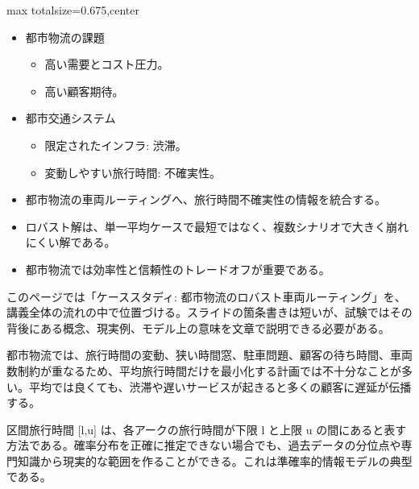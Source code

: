 \clearpage
{}
\begin{adjustbox}{max totalsize={\textwidth}{0.675\textheight},center}
\begin{minipage}{\textwidth}\scriptsize
\begin{minipage}[t]{0.485\textwidth}
\begin{itemize}
\item 都市物流の課題
\begin{itemize}
\item 高い需要とコスト圧力。
\item 高い顧客期待。
\end{itemize}
\item 都市交通システム
\begin{itemize}
\item 限定されたインフラ: 渋滞。
\item 変動しやすい旅行時間: 不確実性。
\end{itemize}
\item 都市物流の車両ルーティングへ、旅行時間不確実性の情報を統合する。
\end{itemize}
\begin{itemize}
\item ロバスト解は、単一平均ケースで最短ではなく、複数シナリオで大きく崩れにくい解である。
\item 都市物流では効率性と信頼性のトレードオフが重要である。
\end{itemize}
\end{minipage}\hfill
\begin{minipage}[t]{0.485\textwidth}
このページでは「ケーススタディ: 都市物流のロバスト車両ルーティング」を、講義全体の流れの中で位置づける。スライドの箇条書きは短いが、試験ではその背後にある概念、現実例、モデル上の意味を文章で説明できる必要がある。\par
都市物流では、旅行時間の変動、狭い時間窓、駐車問題、顧客の待ち時間、車両数制約が重なるため、平均旅行時間だけを最小化する計画では不十分なことが多い。平均では良くても、渋滞や遅いサービスが起きると多くの顧客に遅延が伝播する。\par
区間旅行時間 [l,u] は、各アークの旅行時間が下限 l と上限 u の間にあると表す方法である。確率分布を正確に推定できない場合でも、過去データの分位点や専門知識から現実的な範囲を作ることができる。これは準確率的情報モデルの典型である。\par

\end{minipage}
\end{minipage}
\end{adjustbox}
